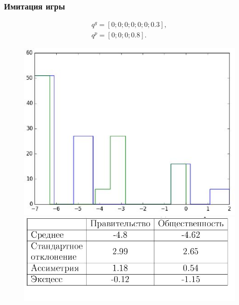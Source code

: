 \documentclass {beamer}
\begin{document}
\begin{frame}
	\frametitle{Имитация игры}
 \begin{gather*}
 q^g = \left[ 0; 0; 0; 0; 0; 0; 0.3 \right], \\
 q^p = \left[ 0; 0; 0; 0.8 \right].
 \end{gather*}
	\begin{figure}
		\begin{minipage}[b]{0.45\textwidth}
			
			\includegraphics[width=\textwidth]{12th}
		\end{minipage}
		\begin{minipage}[b]{0.45\textwidth}
			
			\includegraphics[width=\textwidth]{13th}
		\end{minipage}
		
	\end{figure}
	
\end{frame}
\end{document}
